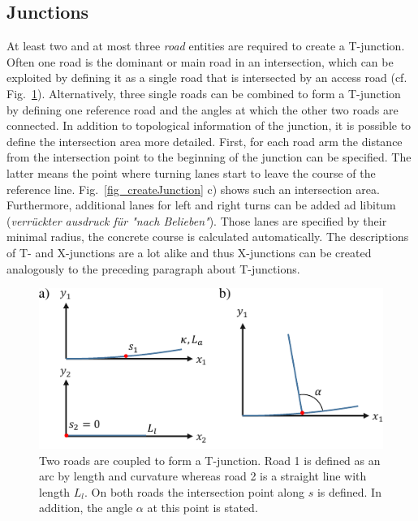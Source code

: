 \documentclass[a4paper, 10pt, conference]{ieeeconf}      %
\begin{document}
\subsection{Junctions}
At least two and at most three \textit{road} entities are required to create a T-junction. Often one road is the dominant or main road in an intersection, which can be exploited by defining it as a single road that is intersected by an access road (cf. Fig.~\ref{fig_juncDef}). Alternatively, three single roads can be combined to form a T-junction by defining one reference road and the angles at which the other two roads are connected. In addition to topological information of the junction, it is possible to define the intersection area more detailed. First, for each road arm the distance from the intersection point to the beginning of the junction can be specified. The latter means the point where turning lanes start to leave the course of the reference line. Fig.~\ref{fig_createJunction} c) shows such an intersection area. Furthermore, additional lanes for left and right turns can be added ad libitum (\textit{verrückter ausdruck für "nach Belieben"}). Those lanes are specified by their minimal radius, the concrete course is calculated automatically. The descriptions of T- and X-junctions are a lot alike and thus X-junctions can be created analogously to the preceding paragraph about T-junctions.
\begin{figure}[thpb] 		
	\centering
	\includegraphics{fig/junctionDef.pdf}
	\caption{Two roads are coupled to form a T-junction. Road 1 is defined as an arc by length and curvature whereas road 2 is a straight line with length $L_l$. On both roads the intersection point along $s$ is defined. In addition, the angle $\alpha$ at this point is stated. }
	\label{fig_juncDef}
\end{figure}
\end{document}
